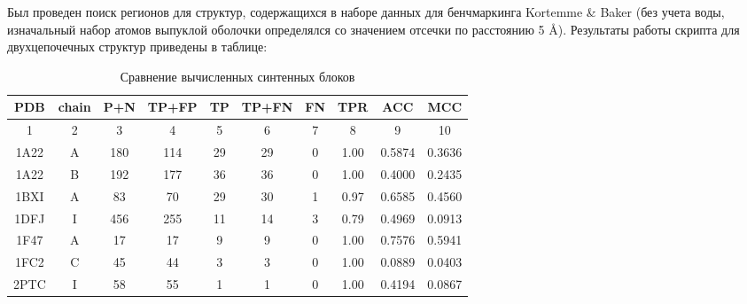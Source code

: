 

Был проведен поиск регионов для структур, содержащихся в наборе данных для бенчмаркинга Kortemme \& Baker \cite{kortemme_alascan_datasets} (без учета воды, изначальный набор атомов выпуклой оболочки определялся со значением отсечки по расстоянию 5 \AA{}). Результаты работы скрипта для двухцепочечных структур приведены в таблице:
\begin{table}[h]
\begin{center}
	\caption{Сравнение вычисленных синтенных блоков}
	\label{tab:comparison}
\begin{tabular}{|c|c|c|c|c|c|c|c|c|c|}
\hline
 PDB & chain & P+N & TP+FP & TP & TP+FN & FN & TPR & ACC & MCC\\
 \hline
  1 & 2 & 3 & 4 & 5 & 6 & 7 & 8 & 9 & 10\\
 \hline
1A22 & A & 180 & 114 & 29 & 29 & 0 & 1.00 & 0.5874 & 0.3636\\
1A22 & B & 192 & 177 & 36 & 36 & 0 & 1.00 &
0.4000 & 0.2435
\\
1BXI & A & 83 & 70& 29& 30& 1 & 0.97 &
0.6585 & 0.4560
\\
1DFJ & I & 456 & 255& 11& 14& 3 & 0.79 &
0.4969 & 0.0913
\\
1F47 & A & 17 & 17&	9& 9& 0 & 1.00 &
0.7576 & 0.5941
\\
1FC2 & C & 45 & 44&	3& 3& 0 & 1.00 &
0.0889 & 0.0403
\\
2PTC & I & 58 & 55&	1& 1& 0 & 1.00 &
0.4194 & 0.0867\\
\hline
\end{tabular}
\end{center}
\end{table}
\\[10pt]
